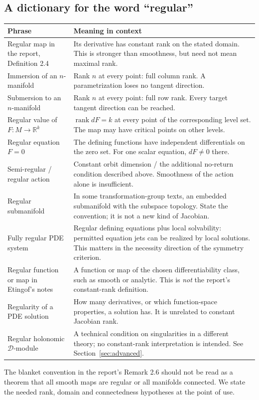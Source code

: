 \documentclass[11pt,a4paper]{article}
\numberwithin{equation}{section}
\theoremstyle{definition}
\theoremstyle{plain}
\theoremstyle{remark}
\newcommand{\R}{\mathbb R}
\newcommand{\rank}{\operatorname{rank}}
\begin{document}
\subsection{A dictionary for the word ``regular''}\label{sec:regular-dictionary}
\begin{longtable}{@{}>{\raggedright\arraybackslash}p{.27\linewidth}>{\raggedright\arraybackslash}p{.67\linewidth}@{}}
\toprule Phrase & Meaning in context \\
\midrule\endhead
Regular map in the report, Definition 2.4 & Its derivative has constant rank on the stated domain. This is stronger than smoothness, but need not mean maximal rank.\\
Immersion of an $n$-manifold & Rank $n$ at every point: full column rank. A parametrization loses no tangent direction.\\
Submersion to an $n$-manifold & Rank $n$ at every point: full row rank. Every target tangent direction can be reached.\\
Regular value of $F:M\to\R^k$ & $\rank dF=k$ at every point of the corresponding level set. The map may have critical points on other levels.\\
Regular equation $F=0$ & The defining functions have independent differentials on the zero set. For one scalar equation, $dF\ne0$ there.\\
Semi-regular / regular action & Constant orbit dimension / the additional no-return condition described above. Smoothness of the action alone is insufficient.\\
Regular submanifold & In some transformation-group texts, an embedded submanifold with the subspace topology. State the convention; it is not a new kind of Jacobian.\\
Fully regular PDE system & Regular defining equations plus local solvability: permitted equation jets can be realized by local solutions. This matters in the necessity direction of the symmetry criterion.\\
Regular function or map in Etingof's notes & A function or map of the chosen differentiability class, such as smooth or analytic. This is \emph{not} the report's constant-rank definition.\\
Regularity of a PDE solution & How many derivatives, or which function-space properties, a solution has. It is unrelated to constant Jacobian rank.\\
Regular holonomic $\mathcal D$-module & A technical condition on singularities in a different theory; no constant-rank interpretation is intended. See Section~\ref{sec:advanced}.\\
\bottomrule
\end{longtable}
The blanket convention in the report's Remark 2.6 should not be read as a theorem that all smooth maps are regular or all manifolds connected. We state the needed rank, domain and connectedness hypotheses at the point of use.
\end{document}
